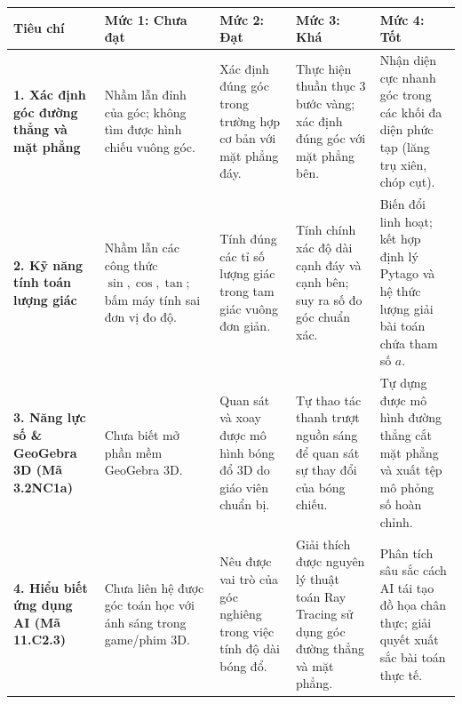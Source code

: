 \documentclass[12pt, a4paper]{article}
\begin{document}
\begin{center}
\begin{tabularx}{\textwidth}{|p{2.8cm}|X|X|X|X|}
    \hline
    \textbf{Tiêu chí} & \textbf{Mức 1: Chưa đạt} & \textbf{Mức 2: Đạt} & \textbf{Mức 3: Khá} & \textbf{Mức 4: Tốt} \\ \hline
    \textbf{1. Xác định góc đường thẳng và mặt phẳng} & Nhầm lẫn đỉnh của góc; không tìm được hình chiếu vuông góc. & Xác định đúng góc trong trường hợp cơ bản với mặt phẳng đáy. & Thực hiện thuần thục 3 bước vàng; xác định đúng góc với mặt phẳng bên. & Nhận diện cực nhanh góc trong các khối đa diện phức tạp (lăng trụ xiên, chóp cụt). \\ \hline
    \textbf{2. Kỹ năng tính toán lượng giác} & Nhầm lẫn các công thức $\sin, \cos, \tan$; bấm máy tính sai đơn vị đo độ. & Tính đúng các tỉ số lượng giác trong tam giác vuông đơn giản. & Tính chính xác độ dài cạnh đáy và cạnh bên; suy ra số đo góc chuẩn xác. & Biến đổi linh hoạt; kết hợp định lý Pytago và hệ thức lượng giải bài toán chứa tham số $a$. \\ \hline
    \textbf{3. Năng lực số \& GeoGebra 3D (Mã 3.2NC1a)} & Chưa biết mở phần mềm GeoGebra 3D. & Quan sát và xoay được mô hình bóng đổ 3D do giáo viên chuẩn bị. & Tự thao tác thanh trượt nguồn sáng để quan sát sự thay đổi của bóng chiếu. & Tự dựng được mô hình đường thẳng cắt mặt phẳng và xuất tệp mô phỏng số hoàn chỉnh. \\ \hline
    \textbf{4. Hiểu biết ứng dụng AI (Mã 11.C2.3)} & Chưa liên hệ được góc toán học với ánh sáng trong game/phim 3D. & Nêu được vai trò của góc nghiêng trong việc tính độ dài bóng đổ. & Giải thích được nguyên lý thuật toán Ray Tracing sử dụng góc đường thẳng và mặt phẳng. & Phân tích sâu sắc cách AI tái tạo đồ họa chân thực; giải quyết xuất sắc bài toán thực tế. \\ \hline
\end{tabularx}
\end{center}
\end{document}
